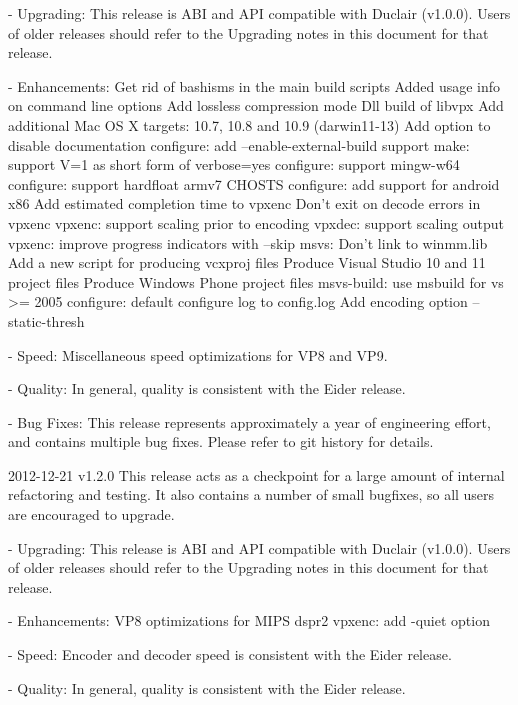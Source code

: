 \begin{DoxyVerbInclude}
  - Upgrading:
    This release is ABI and API compatible with Duclair (v1.0.0). Users
    of older releases should refer to the Upgrading notes in this document
    for that release.

  - Enhancements:
      Get rid of bashisms in the main build scripts
      Added usage info on command line options
      Add lossless compression mode
      Dll build of libvpx
      Add additional Mac OS X targets: 10.7, 10.8 and 10.9 (darwin11-13)
      Add option to disable documentation
      configure: add --enable-external-build support
      make: support V=1 as short form of verbose=yes
      configure: support mingw-w64
      configure: support hardfloat armv7 CHOSTS
      configure: add support for android x86
      Add estimated completion time to vpxenc
      Don't exit on decode errors in vpxenc
      vpxenc: support scaling prior to encoding
      vpxdec: support scaling output
      vpxenc: improve progress indicators with --skip
      msvs: Don't link to winmm.lib
      Add a new script for producing vcxproj files
      Produce Visual Studio 10 and 11 project files
      Produce Windows Phone project files
      msvs-build: use msbuild for vs >= 2005
      configure: default configure log to config.log
      Add encoding option --static-thresh

  - Speed:
      Miscellaneous speed optimizations for VP8 and VP9.

  - Quality:
      In general, quality is consistent with the Eider release.

  - Bug Fixes:
      This release represents approximately a year of engineering effort,
      and contains multiple bug fixes. Please refer to git history for details.


2012-12-21 v1.2.0
  This release acts as a checkpoint for a large amount of internal refactoring
  and testing. It also contains a number of small bugfixes, so all users are
  encouraged to upgrade.

  - Upgrading:
    This release is ABI and API compatible with Duclair (v1.0.0). Users
    of older releases should refer to the Upgrading notes in this
    document for that release.

  - Enhancements:
      VP8 optimizations for MIPS dspr2
      vpxenc: add -quiet option

  - Speed:
      Encoder and decoder speed is consistent with the Eider release.

  - Quality:
      In general, quality is consistent with the Eider release.


\end{DoxyVerbInclude}
